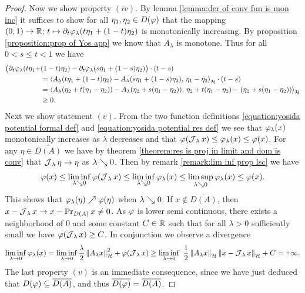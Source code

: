 \begin{proof}
	Now we show property $ (iv) $. By lemma \ref{lemma:der of conv fun is mon inc}
	it suffices
	to show for all $\eta_1,\eta_2\in D(\varphi)$ that the mapping
	$ (0,1)\rightarrow\mathbb{R};\,t\mapsto \partial_t\varphi_\lambda(t \eta_1+(1-t)\eta_2) $
	is monotonically increasing. By proposition \ref{proposition:prop of Yos app}
	we know that $ A_\lambda $ is monotone. Thus for all $ 0<s\leq t<1 $ we have
	\begin{align*}
		\big(\partial_t \varphi_\lambda(t \eta_1+&(1-t)\eta_2)
		-\partial_t \varphi_\lambda(s \eta_1+(1-s)\eta_2)\big)\cdot(t-s)\\
		&=\left\langle A_\lambda(t \eta_1+(1-t)\eta_2)
			-A_\lambda(s \eta_1+(1-s)\eta_2),\,\eta_1-\eta_2\right\rangle_{\mathcal{H}}\cdot(t-s)\\
		&=\left\langle A_\lambda(\eta_2+t(\eta_1-\eta_2))
			-A_\lambda(\eta_2+s(\eta_1-\eta_2)),\,
			\eta_2+t(\eta_1-\eta_2)-(\eta_2+s(\eta_1-\eta_2))\right\rangle_{\mathcal{H}}\\
		&\geq 0.
	\end{align*}
	Next we show statement $ (v) $. 
	From the two function definitions \eqref{equation:yosida potential formal def} 
	and \eqref{equation:yosida potential res def}
	we see that $ \varphi_\lambda(x) $ monotonically
	increases as $ \lambda $ decreases and that 
	$ \varphi(\operatorname{\mathcal{J}}_\lambda x)\leq \varphi_\lambda(x)\leq \varphi(x) $. 
	For any $ \eta\in\overline{D(A)} $ we have by 
	theorem \ref{theorem:res is proj in limit and dom is conv}
	that $ \operatorname{\mathcal{J}}_\lambda\eta\rightarrow\eta $ as $ \lambda\searrow 0 $. 
	Then by remark \ref{remark:lim inf prop lsc}
	we have
	\begin{align*}
		\varphi(x)
		\leq\liminf_{\lambda\searrow 0} \varphi(\operatorname{\mathcal{J}}_\lambda x)
		\leq\liminf_{\lambda\searrow 0} \varphi_\lambda(x)
		\leq\limsup_{\lambda\searrow 0} \varphi_\lambda(x)
		\leq \varphi(x).
	\end{align*}
	This shows that $ \varphi_\lambda(\eta)\nearrow\varphi(\eta) $
	when $ \lambda\searrow 0 $. If $ x\notin \overline{D(A)} $,
	then $ x-\operatorname{\mathcal{J}}_\lambda x\rightarrow x-\operatorname{\mathrm{Pr}}_{D(A)} x\neq 0 $. As $ \varphi $
	is lower semi continuous, there exists a neighborhood
	of $ 0 $ and some constant $ C\in\mathbb{R} $
	such that for all $ \lambda >0 $ sufficiently small
	we have $ \varphi(\operatorname{\mathcal{J}}_\lambda x)\geq C $. In conjunction
	we observe a divergence
	\begin{align*}
		\liminf_{\lambda\ra 0}\vp_\lambda(x)
		=\liminf_{\lambda\ra 0}\frac{\lambda}{2}\norm{A_\lambda x}^2
		+\vp(\res_\lambda x)
		\geq \liminf_{\lambda\ra 0}\
		\frac{1}{2}\norm{A_\lambda x}\norm{x-\res_\lambda x}+C
		=\plus\infty.
	\end{align*}
	The last property $ (v) $ is an immediate 
	consequence, since we have just
	deduced that $ D(\varphi)\subseteq\overline{D(A)} $,
	and thus $ \overline{D(\varphi)}=\overline{D(A)} $.
\end{proof}